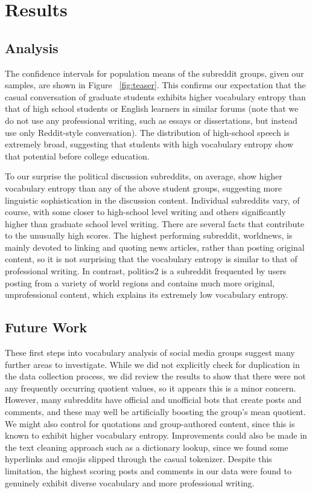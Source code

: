\documentclass[sigconf]{acmart}
\begin{document}
\section{Results}

\subsection{Analysis}

The confidence intervals for population means of the subreddit groups, given
our samples, are shown in Figure ~\ref{fig:teaser}. This confirms our expectation that
the casual conversation of graduate students exhibits higher vocabulary
entropy than that of high school students or English learners in similar
forums (note that we do not use any professional writing, such as essays or
dissertations, but instead use only Reddit-style conversation). The
distribution of high-school speech is extremely broad, suggesting that
students with high vocabulary entropy show that potential before college
education. 

To our surprise the political discussion subreddits, on average, show higher
vocabulary entropy than any of the above student groups, suggesting more
linguistic sophistication in the discussion content. Individual subreddits
vary, of course, with some closer to high-school level writing and others
significantly higher than graduate school level writing. There are several
facts that contribute to the unusually high scores. The highest performing
subreddit, worldnews, is mainly devoted to linking and quoting news
articles, rather than posting original content, so it is not surprising that
the vocabulary entropy is similar to that of professional writing. In
contrast, politics2 is a subreddit frequented by users posting from a
variety of world regions and contains much more original, unprofessional
content, which explains its extremely low vocabulary entropy. 

\subsection{Future Work}

These first steps into vocabulary analysis of social media groups suggest
many further areas to investigate. While we did not explicitly check for
duplication in the data collection process, we did review the results to
show that there were not any frequently occurring quotient values, so it
appears this is a minor concern. However, many subreddits have official and
unofficial bots that create posts and comments, and these may well be
artificially boosting the group's mean quotient. We might also control for
quotations and group-authored content, since this is known to exhibit higher
vocabulary entropy. Improvements could also be made in the text cleaning
approach such as a dictionary lookup, since we found some hyperlinks and
emojis slipped through the casual tokenizer. Despite this limitation, the
highest scoring posts and comments in our data were found to genuinely
exhibit diverse vocabulary and more professional writing. 
\end{document}

